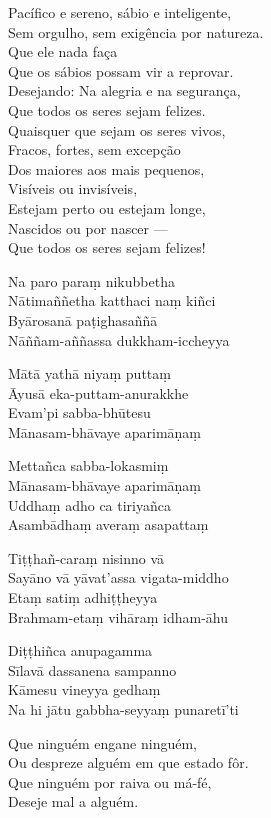 Pacífico e sereno, sábio e inteligente,\\
Sem orgulho, sem exigência por natureza.\\
Que ele nada faça\\
Que os sábios possam vir a reprovar.\\
Desejando: Na alegria e na segurança,\\
Que todos os seres sejam felizes.\\
Quaisquer que sejam os seres vivos,\\
Fracos, fortes, sem excepção\\
Dos maiores aos mais pequenos,\\
Visíveis ou invisíveis,\\
Estejam perto ou estejam longe,\\
Nascidos ou por nascer ---\\
Que todos os seres sejam felizes!

\clearpage

Na paro paraṃ nikubbetha\\
Nātimaññetha katthaci naṃ kiñci\\
Byārosanā paṭighasaññā\\
Nāññam-aññassa dukkham-iccheyya

Mātā yathā niyaṃ puttaṃ\\
Āyusā eka-puttam-anurakkhe\\
Evam'pi sabba-bhūtesu\\
Mānasam-bhāvaye aparimāṇaṃ

Mettañca sabba-lokasmiṃ\\
Mānasam-bhāvaye aparimāṇaṃ\\
Uddhaṃ adho ca tiriyañca\\
Asambādhaṃ averaṃ asapattaṃ

Tiṭṭhañ-caraṃ nisinno vā\\
Sayāno vā yāvat'assa vigata-middho\\
Etaṃ satiṃ adhiṭṭheyya\\
Brahmam-etaṃ vihāraṃ idham-āhu

Diṭṭhiñca anupagamma\\
Sīlavā dassanena sampanno\\
Kāmesu vineyya gedhaṃ\\
Na hi jātu gabbha-seyyaṃ punaretī'ti

\clearpage

Que ninguém engane ninguém,\\
Ou despreze alguém em que estado fôr.\\
Que ninguém por raiva ou má-fé,\\
Deseje mal a alguém.

